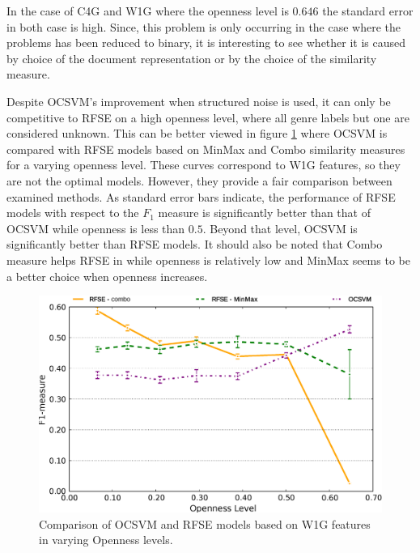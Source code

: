 In the case of C4G and W1G where the openness level is $0.646$ the standard error in both case is high. Since, this problem is only occurring in the case where the problems has been reduced to binary, it is interesting to see whether it is caused by choice of the document representation or by the choice of the similarity measure.


Despite OCSVM's improvement when structured noise is used, it can only be competitive to RFSE on a high openness level, where all genre labels but one are considered unknown. This can be better viewed in figure \ref{chap:noise:fig:RFSE_vs_OCSVME_W1G_openness_test} where OCSVM is compared with RFSE models based on MinMax and Combo similarity measures for a varying openness level. These curves correspond to W1G features, so they are not the optimal models. However, they provide a fair comparison between examined methods. As standard error bars indicate, the performance of RFSE models with respect to the $F_{1}$ measure is significantly better than that of OCSVM while openness is less than $0.5$. Beyond that level, OCSVM is significantly better than RFSE models. It should also be noted that Combo measure helps RFSE in while openness is relatively low and MinMax seems to be a better choice when openness increases.

\begin{figure}[t]
\begin{center}
    \includegraphics[scale=0.45]{Figures/RFSE_vs_OCSVME_W1G.eps}
	\caption{Comparison of OCSVM and RFSE models based on W1G features in varying Openness levels.}
	\label{chap:noise:fig:RFSE_vs_OCSVME_W1G_openness_test}
\end{center}
\end{figure}

